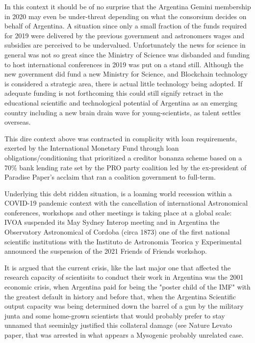 \documentclass[final,5p,times,twocolumn,authoryear]{elsarticle}
\begin{document}
In this context it should be of no surprise that the Argentina Gemini membership in 2020 may even be under-threat depending on what the consorsium decides on behalf of Argentina. A situation since only a small fraction of the funds required for 2019 were delivered by the previous government and astronomers wages and subsidies are perceived to be undervalued. Unfortunately the news for science in general was not so great since the Ministry of Science was disbanded and funding to host international conferences in 2019 was put on a stand still. Although the new government did fund a new Ministry for Science, and Blockchain technology is considered a strategic area, there is actual little technology being adopted. If adequate funding is not forthcoming this could still signify retract in the educational scientific and technological potential of Argentina as an emerging country including a new brain drain wave for young-scientists, as talent settles overseas. 

This dire context above was contracted in complicity with loan requirements, exerted by the International Monetary Fund through loan obligations/conditioning that prioritized a creditor bonanza scheme based on a 70\% bank lending rate set by the PRO party coalition led by the ex-president of Paradise Paper's acclaim that ran a coalition government to full-term. 

Underlying this debt ridden situation, is a loaming world recession within a COVID-19 pandemic context with the cancellation of international Astronomical conferences, workshops and other meetings is taking place at a global scale: IVOA suspended its May Sydney Interop meeting and in Argentina the Observatory Astronomical of Cordoba (circa 1873) one of the first national scientific institutions with the Instituto de Astronomia Teorica y Experimental announced the suspension of the 2021 Friends of Friends workshop. 

It is argued that the current crisis, like the last major one that affected the research capacity of scientisits to conduct their work in Argentina was the 2001 economic crisis, when Argentina paid for being the "poster child of the IMF" with the greatest default in history and before that, when the Argentina Scientific output capacity was being determined down the barrel of a gun by the military junta and some home-grown scientists that would probably prefer to stay unnamed that seeminlgy justified this collateral damage (see Nature Levato paper, that was arrested in what appears a Mysogenic probably unrelated case.
\end{document}
